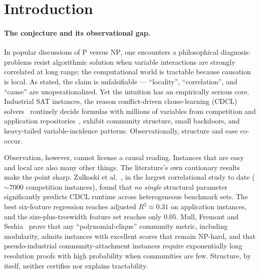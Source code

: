 \documentclass[11pt]{article}
\begin{document}
\section{Introduction}
\label{sec:intro}

\paragraph{The conjecture and its observational gap.}
In popular discussions of \textsc{P} versus \textsc{NP}, one encounters a
philosophical diagnosis: problems resist algorithmic solution when variable
interactions are strongly correlated at long range; the computational world is
tractable because causation is local. As stated, the claim is unfalsifiable
--- ``locality'', ``correlation'', and ``cause'' are unoperationalized. Yet the
intuition has an empirically serious core. Industrial SAT instances, the
reason conflict-driven clause-learning (CDCL) solvers~\cite{marques2009}
routinely decide formulas with millions of variables from competition and
application repositories~\cite{satcomp}, exhibit community structure, small
backdoors, and heavy-tailed variable-incidence patterns. Observationally,
structure and ease co-occur.

Observation, however, cannot license a causal reading. Instances that are easy
and local are also many other things. The literature's own cautionary results
make the point sharp. Zulkoski et al.~\cite{zulkoski2018}, in the largest
correlational study to date (${\sim}7000$ competition instances), found that
\emph{no single} structural parameter significantly predicts CDCL runtime
across heterogeneous benchmark sets. The best six-feature regression reaches
adjusted $R^2 \approx 0.31$ on application instances, and the
size-plus-treewidth feature set reaches only $0.05$. Mull, Fremont and Seshia~\cite{mull2016} prove that
any ``polynomial-clique'' community metric, including modularity, admits
instances with excellent scores that remain \textsc{NP}-hard, and that
pseudo-industrial community-attachment instances require exponentially long
resolution proofs with high probability when communities are few. Structure,
by itself, neither certifies nor explains tractability.
\end{document}
